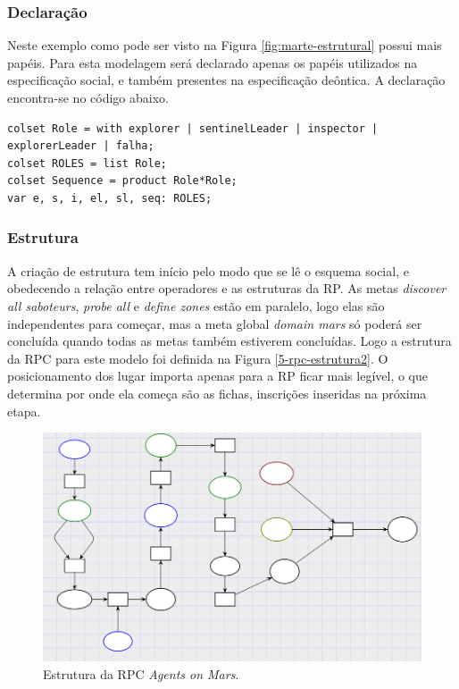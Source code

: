 \subsubsection{Declaração}

Neste exemplo como pode ser visto na Figura \ref{fig:marte-estrutural} possui mais papéis. Para esta modelagem será declarado apenas os papéis utilizados na especificação social, e também presentes na especificação deôntica. A declaração encontra-se no código abaixo.

\begin{lstlisting}
colset Role = with explorer | sentinelLeader | inspector | explorerLeader | falha;
colset ROLES = list Role;
colset Sequence = product Role*Role;
var e, s, i, el, sl, seq: ROLES;
\end{lstlisting}

\subsubsection{Estrutura}

A criação de estrutura tem início pelo modo que se lê o esquema social, e obedecendo a relação entre operadores e as estruturas da RP. As metas \textit{discover all saboteurs}, \textit{probe all} e \textit{define zones} estão em paralelo, logo elas são independentes para começar, mas a meta global \textit{domain mars} só poderá ser concluída quando todas as metas também estiverem concluídas. Logo a estrutura da RPC para este modelo foi definida na Figura \ref{5-rpc-estrutura2}. O posicionamento dos lugar importa apenas para a RP ficar mais legível, o que determina por onde ela começa são as fichas, inscrições inseridas na próxima etapa.

\begin{figure}[ht]
\centering
\includegraphics[scale=0.55]{imagens/5-rpc-estrutura2.png}
\caption{Estrutura da RPC \textit{Agents on Mars}.}
\label{fig:5-rpc-estrutura2}
\end{figure}

